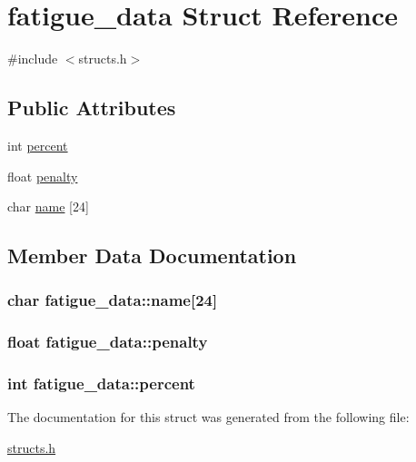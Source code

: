 \hypertarget{structfatigue__data}{\section{fatigue\-\_\-data Struct Reference}
\label{structfatigue__data}
}


{\ttfamily \#include $<$structs.\-h$>$}

\subsection*{Public Attributes}
\begin{DoxyCompactItemize}
\item 
int \hyperlink{structfatigue__data_a4ee8c3221b925ef1b15afc2f75a1163a}{percent}
\item 
float \hyperlink{structfatigue__data_ae3e34243d0c32fb07e4f96d170c7ee64}{penalty}
\item 
char \hyperlink{structfatigue__data_abbc142d9179a70796f89930cf23423b8}{name} \mbox{[}24\mbox{]}
\end{DoxyCompactItemize}


\subsection{Member Data Documentation}
\hypertarget{structfatigue__data_abbc142d9179a70796f89930cf23423b8}{
\subsubsection[{name}]{\setlength{\rightskip}{0pt plus 5cm}char fatigue\-\_\-data\-::name\mbox{[}24\mbox{]}}}\label{structfatigue__data_abbc142d9179a70796f89930cf23423b8}
\hypertarget{structfatigue__data_ae3e34243d0c32fb07e4f96d170c7ee64}{
\subsubsection[{penalty}]{\setlength{\rightskip}{0pt plus 5cm}float fatigue\-\_\-data\-::penalty}}\label{structfatigue__data_ae3e34243d0c32fb07e4f96d170c7ee64}
\hypertarget{structfatigue__data_a4ee8c3221b925ef1b15afc2f75a1163a}{
\subsubsection[{percent}]{\setlength{\rightskip}{0pt plus 5cm}int fatigue\-\_\-data\-::percent}}\label{structfatigue__data_a4ee8c3221b925ef1b15afc2f75a1163a}


The documentation for this struct was generated from the following file\-:\begin{DoxyCompactItemize}
\item 
\hyperlink{structs_8h}{structs.\-h}\end{DoxyCompactItemize}
